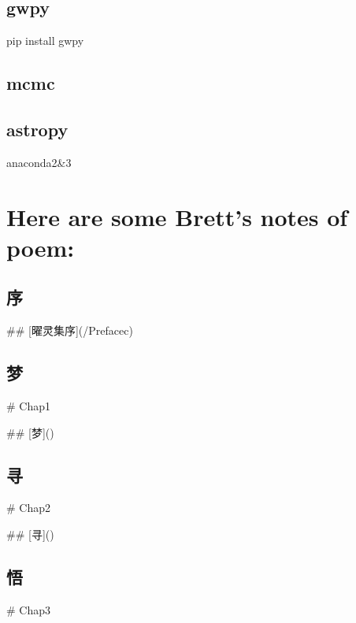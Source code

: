 \documentclass[letterpaper,10pt,english]{sphinxmanual}
\begin{document}
\section{gwpy}
\label{\detokenize{advanced/02_gwpy::doc}}\label{\detokenize{advanced/02_gwpy:gwpy}}
pip install gwpy


\section{mcmc}
\label{\detokenize{advanced/03_mcmc:mcmc}}\label{\detokenize{advanced/03_mcmc::doc}}

\section{astropy}
\label{\detokenize{advanced/04_astropy:astropy}}\label{\detokenize{advanced/04_astropy::doc}}
anaconda2\&3


\chapter{Here are some Brett's notes of poem:}
\label{\detokenize{poem/index::doc}}\label{\detokenize{poem/index:here-are-some-brett-s-notes-of-poem}}

\section{序}
\label{\detokenize{poem/Preface::doc}}\label{\detokenize{poem/Preface:id1}}
\#\# {[}曜灵集序{]}(/Prefacec)


\section{梦}
\label{\detokenize{poem/Chap1::doc}}\label{\detokenize{poem/Chap1:id1}}
\# Chap1

\#\# {[}梦{]}()


\section{寻}
\label{\detokenize{poem/Chap2::doc}}\label{\detokenize{poem/Chap2:id1}}
\# Chap2

\#\# {[}寻{]}()


\section{悟}
\label{\detokenize{poem/Chap3::doc}}\label{\detokenize{poem/Chap3:id1}}
\# Chap3
\end{document}
